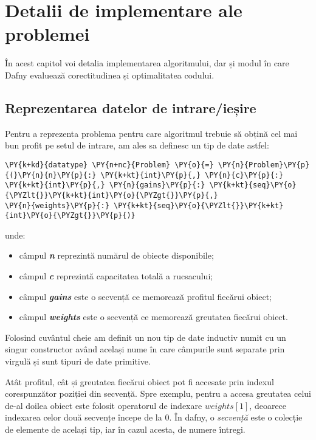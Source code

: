\lstset{style=mylststyle}
\begin{sloppypar}


\chapter{Detalii de implementare ale problemei}
În acest capitol voi detalia implementarea algoritmului, dar și modul în care Dafny evaluează corectitudinea și optimalitatea codului. 

\section{Reprezentarea datelor de intrare/ieșire}

Pentru a reprezenta problema pentru care algoritmul trebuie să obțină cel mai bun profit pe setul de intrare, am ales sa definesc un tip de date  astfel:

\begin{Verbatim}[commandchars=\\\{\}]
\PY{k+kd}{datatype} \PY{n+nc}{Problem} \PY{o}{=} \PY{n}{Problem}\PY{p}{(}\PY{n}{n}\PY{p}{:} \PY{k+kt}{int}\PY{p}{,} \PY{n}{c}\PY{p}{:} \PY{k+kt}{int}\PY{p}{,} \PY{n}{gains}\PY{p}{:} \PY{k+kt}{seq}\PY{o}{\PYZlt{}}\PY{k+kt}{int}\PY{o}{\PYZgt{}}\PY{p}{,} 
\PY{n}{weights}\PY{p}{:} \PY{k+kt}{seq}\PY{o}{\PYZlt{}}\PY{k+kt}{int}\PY{o}{\PYZgt{}}\PY{p}{)} 
\end{Verbatim}
unde:
\begin{itemize}
    \item câmpul \textit{\textbf{\textcolor{coleight}{n}}} reprezintă numărul de obiecte disponibile;
    \item câmpul \textit{\textbf{\textcolor{coleight}{c}}} reprezintă capacitatea totală a rucsacului;
    \item câmpul \textit{\textbf{\textcolor{coleight}{gains}}} este o secvență ce memorează profitul fiecărui obiect;
    \item câmpul \textit{\textbf{\textcolor{coleight}{weights}}} este o secvență ce memorează greutatea fiecărui obiect.
\end{itemize} \par
Folosind cuvântul cheie  am definit un nou tip de date inductiv numit  cu un singur constructor având același nume în care câmpurile sunt separate prin virgulă și sunt tipuri de date primitive.
\par
Atât profitul, cât și greutatea fiecărui obiect pot fi accesate prin indexul corespunzător poziției din secvență. Spre exemplu, pentru a accesa greutatea celui de-al doilea obiect este folosit operatorul de indexare $weights[1]$, deoarece indexarea celor două secvențe începe de la 0. În dafny, o \textit{secvență} este o colecție de elemente de același tip, iar în cazul acesta, de numere întregi. \\ \par


\end{sloppypar}
